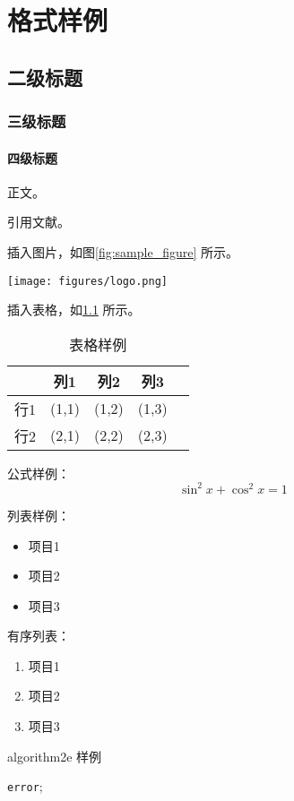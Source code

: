 \chapter{格式样例}
\section{二级标题}
\subsection{三级标题}
\subsubsection{四级标题}
正文。

引用文献\cite{刘海洋2013LATEX}。

插入图片，如图\ref{fig:sample_figure} 所示。
\begin{figure*}[htb]
\centering
\texttt{[image: figures/logo.png]}
\caption{插图样例}
\label{fig:sample_figure}
\end{figure*}

插入表格，如\cref{tab:sample_table} 所示。
\begin{table}[htb]
\centering
\caption{表格样例}
\label{tab:sample_table}
\begin{tabular}{lcccc}
\toprule
~~&列1&列2&列3\\
\midrule
行1 & (1,1) & (1,2) & (1,3)\\
行2 & (2,1) & (2,2) & (2,3)\\
\bottomrule
\end{tabular}
\end{table}

公式样例：
\begin{equation}
\sin^2x+\cos^2x=1
\end{equation}

列表样例：
\begin{itemize}
    \item 项目1
    \item 项目2
    \item 项目3
\end{itemize}

有序列表：
\begin{enumerate}
    \item 项目1
    \item 项目2
    \item 项目3
\end{enumerate}

algorithm2e 样例

\begin{algorithm}[htb]
\caption{如何写论文}
\label{alg:symbol-lookup}

\Return \texttt{error}; 
\end{algorithm}

\FloatBarrier
